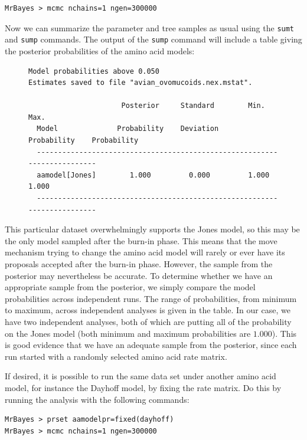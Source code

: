 \documentclass[12pt]{book}
\begin{document}
\begin{Verbatim}
MrBayes > mcmc nchains=1 ngen=300000
\end{Verbatim}

Now we can summarize the parameter and tree samples as usual using the \texttt{sumt} and
\texttt{sump} commands. The output of the \texttt{sump} command will include a table giving the
posterior probabilities of the amino acid models:

\begin{figure}[h]
\centering
\begin{BVerbatim}
Model probabilities above 0.050
Estimates saved to file "avian_ovomucoids.nex.mstat".

                      Posterior     Standard        Min.           Max.
  Model              Probability    Deviation    Probability    Probability
  -------------------------------------------------------------------------
  aamodel[Jones]        1.000         0.000         1.000          1.000
  -------------------------------------------------------------------------
\end{BVerbatim}
\end{figure}

This particular dataset overwhelmingly supports the Jones model, so this may be the only model
sampled after the burn-in phase. This means that the move mechanism trying to change the amino acid
model will rarely or ever have its proposals accepted after the burn-in phase. However, the sample
from the posterior may nevertheless be accurate. To determine whether we have an appropriate sample
from the posterior, we simply compare the model probabilities across independent runs. The range of
probabilities, from minimum to maximum, across independent analyses is given in the table. In our
case, we have two independent analyses, both of which are putting all of the probability on the
Jones model (both minimum and maximum probabilities are $1.000$). This is good evidence that we
have an adequate sample from the posterior, since each run started with a randomly selected amino
acid rate matrix.

If desired, it is possible to run the same data set under another amino acid model, for instance
the Dayhoff model, by fixing the rate matrix. Do this by running the analysis with the following
commands:

\begin{Verbatim}
MrBayes > prset aamodelpr=fixed(dayhoff)
MrBayes > mcmc nchains=1 ngen=300000
\end{Verbatim}
\end{document}
